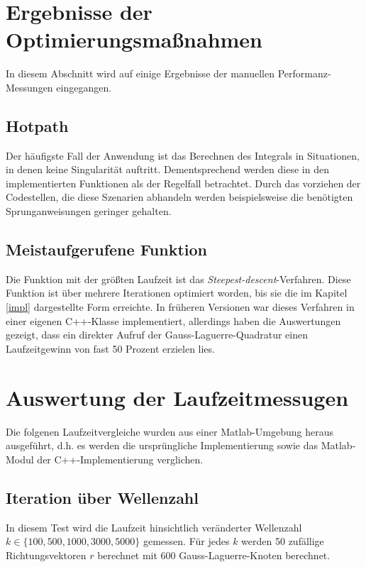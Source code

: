 \section{Ergebnisse der Optimierungsmaßnahmen}

In diesem Abschnitt wird auf einige Ergebnisse der manuellen Performanz-Messungen eingegangen.

\subsection{Hotpath}

Der häufigste Fall der Anwendung ist das Berechnen des Integrals in Situationen, in denen keine Singularität auftritt. 
Dementsprechend werden diese in den implementierten Funktionen als der Regelfall betrachtet.
Durch das vorziehen der Codestellen, die diese Szenarien abhandeln werden beispielsweise die benötigten Sprunganweisungen geringer gehalten.



\subsection{Meistaufgerufene Funktion}

Die Funktion mit der größten Laufzeit ist das \textit{Steepest-descent}-Verfahren.
Diese Funktion ist über mehrere Iterationen optimiert worden, bis sie die im Kapitel \ref{impl} dargestellte Form erreichte.
In früheren Versionen war dieses Verfahren in einer eigenen C++-Klasse implementiert, allerdings haben die Auswertungen gezeigt, dass ein
direkter Aufruf der Gauss-Laguerre-Quadratur einen Laufzeitgewinn von fast 50 Prozent erzielen lies.


\section{Auswertung der Laufzeitmessugen}

Die folgenen Laufzeitvergleiche wurden aus einer Matlab-Umgebung heraus ausgeführt, d.h. es werden die ursprüngliche Implementierung sowie das Matlab-Modul der C++-Implementierung verglichen.


\subsection{Iteration über Wellenzahl}


In diesem Test wird die Laufzeit hinsichtlich veränderter Wellenzahl \linebreak $k \in \{ 100, 500, 1000, 3000, 5000 \}$ gemessen.
Für jedes $k$ werden 50 zufällige Richtungsvektoren $r$ berechnet mit 600 Gauss-Laguerre-Knoten berechnet.


